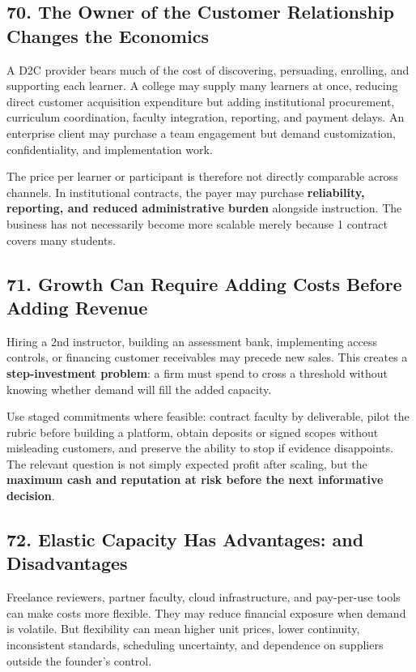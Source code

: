 \subsection*{70. The Owner of the Customer Relationship Changes the Economics}

A D2C provider bears much of the cost of discovering, persuading, enrolling, and supporting each learner. A college may supply many learners at once, reducing direct customer acquisition expenditure but adding institutional procurement, curriculum coordination, faculty integration, reporting, and payment delays. An enterprise client may purchase a team engagement but demand customization, confidentiality, and implementation work.

The price per learner or participant is therefore not directly comparable across channels. In institutional contracts, the payer may purchase \textbf{reliability, reporting, and reduced administrative burden} alongside instruction. The business has not necessarily become more scalable merely because 1 contract covers many students.

\subsection*{71. Growth Can Require Adding Costs Before Adding Revenue}

Hiring a 2nd instructor, building an assessment bank, implementing access controls, or financing customer receivables may precede new sales. This creates a \textbf{step-investment problem}: a firm must spend to cross a threshold without knowing whether demand will fill the added capacity.

Use staged commitments where feasible: contract faculty by deliverable, pilot the rubric before building a platform, obtain deposits or signed scopes without misleading customers, and preserve the ability to stop if evidence disappoints. The relevant question is not simply expected profit after scaling, but the \textbf{maximum cash and reputation at risk before the next informative decision}.

\subsection*{72. Elastic Capacity Has Advantages: and Disadvantages}

Freelance reviewers, partner faculty, cloud infrastructure, and pay-per-use tools can make costs more flexible. They may reduce financial exposure when demand is volatile. But flexibility can mean higher unit prices, lower continuity, inconsistent standards, scheduling uncertainty, and dependence on suppliers outside the founder's control.

